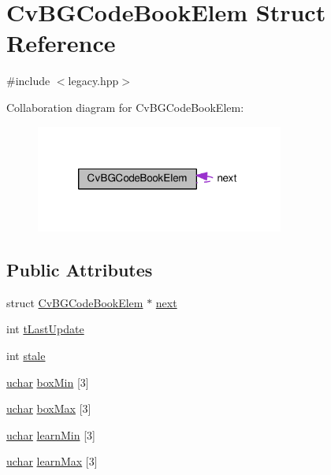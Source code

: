 \hypertarget{structCvBGCodeBookElem}{\section{Cv\-B\-G\-Code\-Book\-Elem Struct Reference}
\label{structCvBGCodeBookElem}
}


{\ttfamily \#include $<$legacy.\-hpp$>$}



Collaboration diagram for Cv\-B\-G\-Code\-Book\-Elem\-:\nopagebreak
\begin{figure}[H]
\begin{center}
\leavevmode
\includegraphics[width=231pt]{structCvBGCodeBookElem__coll__graph}
\end{center}
\end{figure}
\subsection*{Public Attributes}
\begin{DoxyCompactItemize}
\item 
struct \hyperlink{structCvBGCodeBookElem}{Cv\-B\-G\-Code\-Book\-Elem} $\ast$ \hyperlink{structCvBGCodeBookElem_a90f5d806cca33a8c32fb4a0f164cb012}{next}
\item 
int \hyperlink{structCvBGCodeBookElem_ad4f0dd0fbb1b5b498b2a25bf189e4c0c}{t\-Last\-Update}
\item 
int \hyperlink{structCvBGCodeBookElem_a0e90c1442d2b945a5e013dd9bc4ac8a0}{stale}
\item 
\hyperlink{core_2types__c_8h_a65f85814a8290f9797005d3b28e7e5fc}{uchar} \hyperlink{structCvBGCodeBookElem_a6b925a6b35bed62c439693f7577aba4f}{box\-Min} \mbox{[}3\mbox{]}
\item 
\hyperlink{core_2types__c_8h_a65f85814a8290f9797005d3b28e7e5fc}{uchar} \hyperlink{structCvBGCodeBookElem_aeb547cb5906020208a85f248c2ab0bb1}{box\-Max} \mbox{[}3\mbox{]}
\item 
\hyperlink{core_2types__c_8h_a65f85814a8290f9797005d3b28e7e5fc}{uchar} \hyperlink{structCvBGCodeBookElem_acf9a1d5717a48a059dc918ecb66f41e1}{learn\-Min} \mbox{[}3\mbox{]}
\item 
\hyperlink{core_2types__c_8h_a65f85814a8290f9797005d3b28e7e5fc}{uchar} \hyperlink{structCvBGCodeBookElem_afe28345688cc1b32ebf5afeaef1aacec}{learn\-Max} \mbox{[}3\mbox{]}
\end{DoxyCompactItemize}



